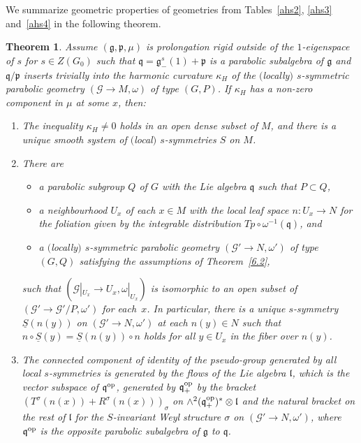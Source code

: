 \documentclass[10pt,a4paper]{amsart}
\newcommand{\om}{\omega}
\newcommand{\si}{\sigma}
\newcommand{\un}{\underline}
\newcommand{\ba}{\mathcal{G}}
\newcommand{\fg}{\mathfrak g}
\newcommand{\fv}{\mathfrak q}
\newcommand{\fp}{\mathfrak p}
\newcommand{\fl}{\mathfrak l}
\numberwithin{equation}{section}
\newtheorem{Theorem}{Theorem}[section]
\begin{document}
We summarize geometric properties of geometries from Tables~\ref{ahs2}, \ref{ahs3} and~\ref{ahs4} in the following theorem.

\begin{Theorem}\label{6.3}
Assume $(\fg,\fp,\mu)$ is prolongation rigid outside of the $1$-eigenspace of $s$ for $s\in Z(G_0)$ such that $\fv=\fg_-^s(1)+\fp$ is a parabolic subalgebra of $\fg$ and $\fv/\fp$ inserts trivially into the harmonic curvature $\kappa_H$ of the $($locally$)$ $s$-symmetric parabolic geometry $(\ba\to M,\om)$ of type $(G,P)$. If $\kappa_H$ has a non-zero component in $\mu$ at some $x$, then:
\begin{enumerate}\itemsep=0pt
\item[$1.$] The inequality $\kappa_H\neq 0$ holds in an open dense subset of $M$, and there is a unique smooth system of $($local$)$ $s$-symmetries $S$ on $M$.
\item[$2.$] There are
\begin{itemize}\itemsep=0pt
\item a parabolic subgroup $Q$ of $G$ with the Lie algebra $\fv$ such that $P\subset Q$,
\item a neighbourhood $U_x$ of each $x\in M$ with the local leaf space $n\colon U_x\to N$ for the foliation given by the integrable distribution $Tp\circ \om^{-1}(\fv)$, and
\item a $($locally$)$ $s$-symmetric parabolic geometry $(\ba'\to N,\om')$ of type~$(G,Q)$ satisfying the assumptions of Theorem~{\rm \ref{6.2}},
\end{itemize}
such that $(\ba|_{U_x}\to U_x,\om|_{U_x})$ is isomorphic to an open subset of $(\ba'\to \ba'/P,\om')$ for each~$x$. In particular, there is a unique $s$-symmetry $\un S(n(y))$ on $(\ba'\to N,\om')$ at each $n(y)\in N$ such that $n\circ \un S(y)=\un S(n(y))\circ n$ holds for all $y\in U_x$ in the fiber over $n(y)$.
\item[$3.$] The connected component of identity of the pseudo-group generated by all local $s$-sym\-met\-ries is generated by the flows of the Lie algebra $\fl$, which is the vector subspace of $\fv^{\rm op}$, generated by $\fv^{\rm op}_+$ by the bracket $(T^\si(n(x))+R^\si(n(x)))_\si$ on $\wedge^2 (\fv^{\rm op}_+)^*\otimes \fl$ and the natural bracket on the rest of $\fl$ for the $S$-invariant Weyl structure $\si$ on $(\ba'\to N,\om')$, where $\fv^{\rm op}$ is the opposite parabolic subalgebra of $\fg$ to $\fv$.


\end{enumerate}
\end{Theorem}
\end{document}
